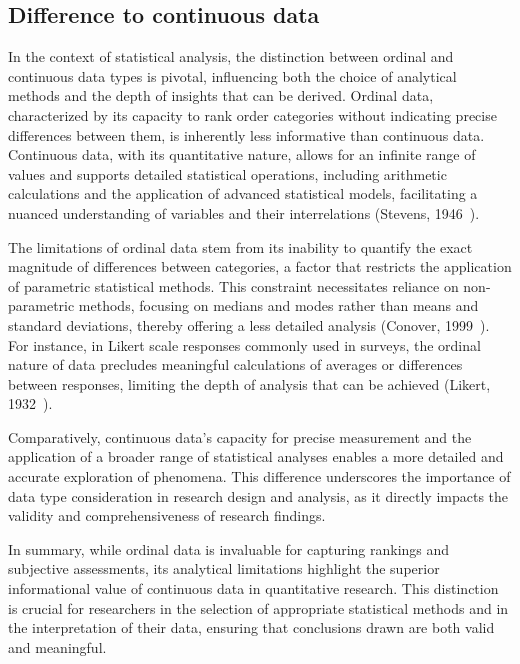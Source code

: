 \documentclass{article}
\begin{document}
\subsection*{Difference to continuous data}

In the context of statistical analysis, the distinction between ordinal and continuous data types is pivotal, influencing both the choice of analytical methods and the depth of insights that can be derived. 
Ordinal data, characterized by its capacity to rank order categories without indicating precise differences between them, is inherently less informative than continuous data. 
Continuous data, with its quantitative nature, allows for an infinite range of values and supports detailed statistical operations, including arithmetic calculations and the application of advanced statistical models, facilitating a nuanced understanding of variables and their interrelations (Stevens, 1946~\cite{Stevens1946}).

The limitations of ordinal data stem from its inability to quantify the exact magnitude of differences between categories, a factor that restricts the application of parametric statistical methods. This constraint necessitates reliance on non-parametric methods, focusing on medians and modes rather than means and standard deviations, thereby offering a less detailed analysis (Conover, 1999~\cite{Conover1999}). 
For instance, in Likert scale responses commonly used in surveys, the ordinal nature of data precludes meaningful calculations of averages or differences between responses, limiting the depth of analysis that can be achieved (Likert, 1932~\cite{Likert1932}).

Comparatively, continuous data's capacity for precise measurement and the application of a broader range of statistical analyses enables a more detailed and accurate exploration of phenomena. This difference underscores the importance of data type consideration in research design and analysis, as it directly impacts the validity and comprehensiveness of research findings.

In summary, while ordinal data is invaluable for capturing rankings and subjective assessments, its analytical limitations highlight the superior informational value of continuous data in quantitative research. This distinction is crucial for researchers in the selection of appropriate statistical methods and in the interpretation of their data, ensuring that conclusions drawn are both valid and meaningful.

\end{document}
